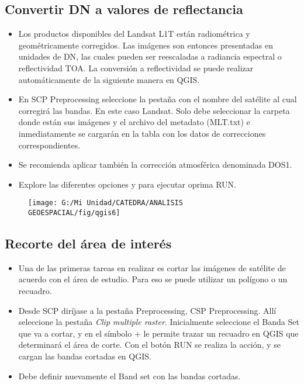 \documentclass[a4paper,oneside,11pt,]{article}
\begin{document}
\subsection{Convertir DN a valores de reflectancia}
\begin{itemize}
\item Los productos disponibles del Landsat L1T están radiométrica y geométricamente corregidos. Las imágenes son entonces presentadas en unidades de DN, las cuales pueden ser reescaladas a radiancia espectral o reflectividad TOA. La conversión a  reflectividad se puede realizar automáticamente de la siguiente manera en QGIS.
\item En SCP Preprocessing seleccione la pestaña con el nombre del satélite al cual corregirá las bandas. En este caso Landsat. Solo debe seleccionar la carpeta donde están sus imágenes y el archivo del metadato (MLT.txt) e inmediatamente se cargarán en la tabla con los datos de correcciones correspondientes. 
\item Se recomienda aplicar también la corrección atmosférica denominada DOS1.
\item Explore las diferentes opciones y para ejecutar oprima RUN.
\end{itemize}

\begin{figure}
\centering
\texttt{[image: G:/Mi Unidad/CATEDRA/ANALISIS GEOESPACIAL/fig/qgis6]}
\end{figure}

\subsection{Recorte del área de interés}
\begin{itemize}
\item Una de las primeras tareas en realizar es cortar las imágenes de satélite de acuerdo con el área de estudio. Para eso se puede utilizar un polígono o un recuadro.
\item Desde SCP diríjase a la pestaña Preprocessing, CSP  Preprocessing. Allí seleccione la pestaña \emph{Clip multiple raster}. Inicialmente seleccione el Banda Set que va a cortar, y en el símbolo + le permite trazar un recuadro en QGIS que determinará el área de corte. Con el botón RUN se realiza la acción, y se cargan las bandas cortadas en QGIS.
\item Debe definir nuevamente el Band set con las bandas cortadas.
\end{itemize}
\end{document}
